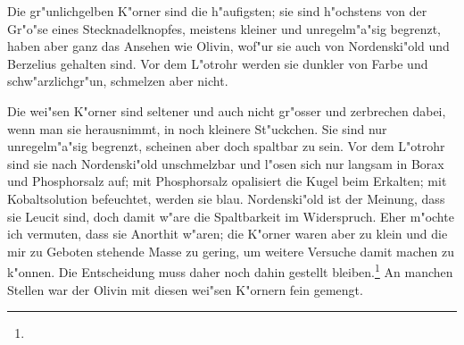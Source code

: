 \documentclass[a4paper, 11pt, oneside]{article}
\begin{document}
Die gr"unlichgelben K"orner sind die h"aufigsten; sie sind h"ochstens von der Gr"o"se eines Stecknadelknopfes, meistens kleiner und unregelm"a"sig begrenzt, haben aber ganz das Ansehen wie Olivin, wof"ur sie auch von Nordenski"old und Berzelius gehalten sind. Vor dem L"otrohr werden sie dunkler von Farbe und schw"arzlichgr"un, schmelzen aber nicht.

Die wei"sen K"orner sind seltener und auch nicht gr"osser und zerbrechen dabei, wenn man sie herausnimmt, in noch kleinere St"uckchen. Sie sind nur unregelm"a"sig begrenzt, scheinen aber doch spaltbar zu sein. Vor dem L"otrohr sind sie nach Nordenski"old unschmelzbar und l"osen sich nur langsam in Borax und Phosphorsalz auf; mit Phosphorsalz opalisiert die Kugel beim Erkalten; mit Kobaltsolution befeuchtet, werden sie blau. Nordenski"old ist der Meinung, dass sie Leucit sind, doch damit w"are die Spaltbarkeit im Widerspruch. Eher m"ochte ich vermuten, dass sie Anorthit w"aren; die K"orner waren aber zu klein und die mir zu Geboten stehende Masse zu gering, um weitere Versuche damit machen zu k"onnen. Die Entscheidung muss daher noch dahin gestellt bleiben.\footnote{} An manchen Stellen war der Olivin mit diesen wei"sen K"ornern fein gemengt.
\end{document}
